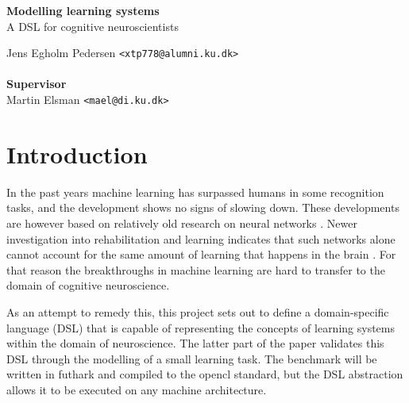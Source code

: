 \documentclass[a4paper,oneside]{memoir}
\begin{document}
    \thispagestyle{empty}
    \begin{adjustwidth}{-3cm}{-1.5cm}
    \vspace*{2.5cm}
    \textbf{\Huge Modelling learning systems} \\
    \vspace*{.8cm}
    {\huge  A DSL for cognitive neuroscientists}\\
    \begin{tabbing}
    Jens Egholm Pedersen \hspace{1cm} \= \texttt{<xtp778@alumni.ku.dk>} \\
    \\[11cm]

    \textbf{\Large Supervisor} \\
    Martin Elsman \hspace{1cm} \texttt{<mael@di.ku.dk>}
    \end{tabbing}
    \end{adjustwidth}
    \newpage
    \ClearWallPaper


\section{Introduction}
In the past years machine learning has surpassed humans in some recognition
tasks, and the development shows no signs of slowing down.
These developments are however based on relatively old research on neural
networks \autocite{Nilsson2009, russel2007}.
Newer investigation into rehabilitation and learning indicates that such
networks alone cannot account for the same amount of learning that happens
in the brain \autocite{Mogensen2011, block2007, russel2007, Moravec98, dennett2017}.
For that reason the breakthroughs in machine learning are hard to transfer
to the domain of cognitive neuroscience.

As an attempt to remedy this, this project sets out to define a domain-specific
language (DSL) that is capable of representing the concepts of learning systems
within the domain of neuroscience.
The latter part of the paper validates this DSL through the modelling of a small
learning task. The benchmark will be written in \gls{futhark} and compiled to
the \gls{opencl} standard, but the DSL abstraction allows it to be executed on
any machine architecture.
\end{document}
